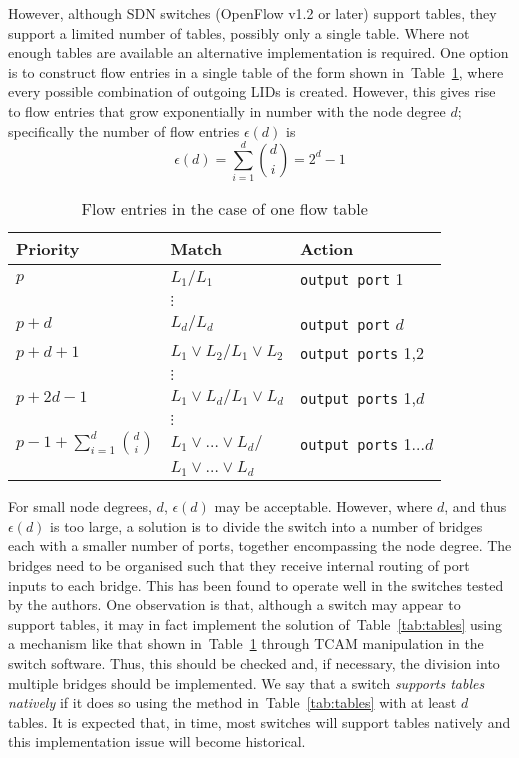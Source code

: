\documentclass[conference]{IEEEtran}
\newcommand{\tabref}[1]{Table~\ref{#1}}
\begin{document}
However, although SDN switches (OpenFlow v1.2 or later) support tables, they support a limited number of tables, possibly only a single table. Where not enough tables are available an alternative implementation is required. One option is to construct flow entries in a single table of the form shown in~\tabref{tab:notables}, where every possible combination of outgoing LIDs is created. However, this gives rise to flow entries that grow exponentially in number with the node degree $d$; specifically the number of flow entries $\epsilon(d)$ is 
\begin{equation}
\label{eq:notable}
\epsilon(d)=\sum_{i=1}^d \binom{d}{i}=2^d-1
\end{equation}
\begin{table}[tb]
  \centering
  \caption{Flow entries in the case of one flow table}
  \vspace{0.5em}
  \begin{tabular}{|l|l|l|}
    \hline
    Priority & Match & Action\\
    \hline
    $p$ & $L_1/L_1$ & \texttt{output port} 1\\
    & $\vdots$ & \\
    $p+d$ & $L_d/L_d$ & \texttt{output port} $d$\\
    $p+d+1$ & $L_1\vee L_2/L_1\vee L_2$ & \texttt{output ports} 1,2\\
    & $\vdots$ & \\
    $p+2d-1$ & $L_1\vee L_d/L_1\vee L_d$ & \texttt{output ports} 1,$d$\\
    & $\vdots$ & \\
    $p-1+\sum_{i=1}^d \binom{d}{i}$ & $L_1\vee \ldots \vee  L_d / $ & \texttt{output ports} 1$\ldots d$\\
    &$L_1\vee \ldots \vee L_d$ & \\
    \hline
  \end{tabular}
  \label{tab:notables}
\end{table}

For small node degrees, $d$, $\epsilon(d)$ may be acceptable. However, where $d$, and thus $\epsilon(d)$ is too large, a solution is to divide the switch into a number of bridges each with a smaller number of ports, together encompassing the node degree. The bridges need to be organised such that they receive internal routing of port inputs to each bridge. This has been found to operate well in the switches tested by the authors. One observation is that, although a switch may appear to support tables, it may in fact implement the solution of~\tabref{tab:tables} using a mechanism like that shown in~\tabref{tab:notables} through TCAM manipulation in the switch software. Thus, this should be checked and, if necessary, the division into multiple bridges should be implemented. We say that a switch \emph{supports tables natively} if it does so using the method in~\tabref{tab:tables} with at least $d$ tables. It is expected that, in time, most switches will support tables natively and this implementation issue will become historical.
\end{document}
